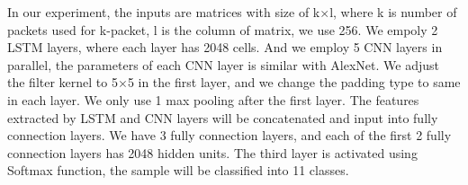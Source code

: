 \documentclass[conference]{IEEEtran}
\begin{document}

In our experiment, the inputs are matrices with size of k$\times$l, where k is number of packets used for k-packet, l is the column of matrix, we use 256. We empoly 2 LSTM layers, where each layer has 2048 cells. And we employ 5 CNN layers in parallel, the parameters of each CNN layer is similar with AlexNet. We adjust the filter kernel to 5$\times$5 in the first layer, and we change the padding type to same in each layer. We only use 1 max pooling after the first layer. The features extracted by LSTM and CNN layers will be concatenated and input into fully connection layers. We have 3 fully connection layers, and each of the first 2 fully connection layers has 2048 hidden units. The third layer is activated using Softmax function, the sample will be classified into 11 classes.


\end{document}
